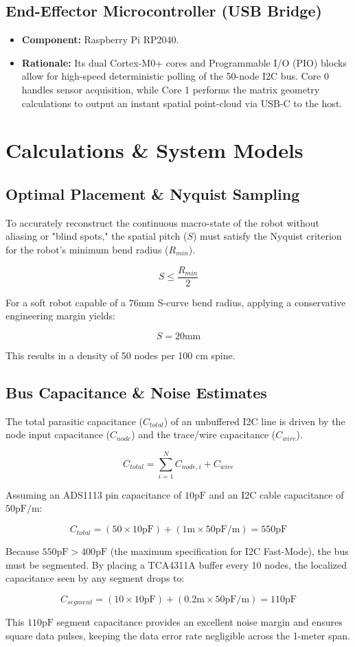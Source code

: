 \documentclass[11pt]{article}
\begin{document}
\subsection{End-Effector Microcontroller (USB Bridge)}
\begin{itemize}
    \item \textbf{Component:} Raspberry Pi RP2040.
    \item \textbf{Rationale:} Its dual Cortex-M0+ cores and Programmable I/O (PIO) blocks allow for high-speed deterministic polling of the 50-node I2C bus. Core 0 handles sensor acquisition, while Core 1 performs the matrix geometry calculations to output an instant spatial point-cloud via USB-C to the host.
\end{itemize}

\section{Calculations \& System Models}

\subsection{Optimal Placement \& Nyquist Sampling}
To accurately reconstruct the continuous macro-state of the robot without aliasing or "blind spots," the spatial pitch ($S$) must satisfy the Nyquist criterion for the robot's minimum bend radius ($R_{min}$).

$$ S \leq \frac{R_{min}}{2} $$

For a soft robot capable of a $76\text{mm}$ S-curve bend radius, applying a conservative engineering margin yields:

$$ S = 20\text{mm} $$

This results in a density of 50 nodes per 100 cm spine.

\subsection{Bus Capacitance \& Noise Estimates}
The total parasitic capacitance ($C_{total}$) of an unbuffered I2C line is driven by the node input capacitance ($C_{node}$) and the trace/wire capacitance ($C_{wire}$).

$$ C_{total} = \sum_{i=1}^{N} C_{node, i} + C_{wire} $$

Assuming an ADS1113 pin capacitance of $10\text{pF}$ and an I2C cable capacitance of $50\text{pF/m}$:

$$ C_{total} = (50 \times 10\text{pF}) + (1\text{m} \times 50\text{pF/m}) = 550\text{pF} $$

Because $550\text{pF} > 400\text{pF}$ (the maximum specification for I2C Fast-Mode), the bus must be segmented. By placing a TCA4311A buffer every 10 nodes, the localized capacitance seen by any segment drops to:

$$ C_{segment} = (10 \times 10\text{pF}) + (0.2\text{m} \times 50\text{pF/m}) = 110\text{pF} $$

This $110\text{pF}$ segment capacitance provides an excellent noise margin and ensures square data pulses, keeping the data error rate negligible across the 1-meter span.
\end{document}
